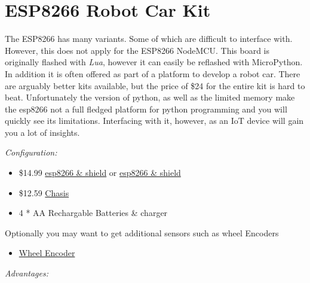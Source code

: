 \section{ESP8266 Robot Car Kit}\label{esp8266-robot-car-kit}

The ESP8266 has many variants. Some of which are difficult to interface
with. However, this does not apply for the ESP8266 NodeMCU. This board
is originally flashed with \emph{Lua}, however it can easily be
reflashed with MicroPython. In addition it is often offered as part of a
platform to develop a robot car. There are arguably better kits
available, but the price of \$24 for the entire kit is hard to beat.
Unfortunately the version of python, as well as the limited memory make
the esp8266 not a full fledged platform for python programming and you
will quickly see its limitations. Interfacing with it, however, as an
IoT device will gain you a lot of insights.

\emph{Configuration:}

\begin{itemize}

\item
  \$14.99
  \href{https://www.amazon.com/KOOKYE-ESP8266-NodeMcu-ESP-12E-Expansion/dp/B01C6MR62E/ref=sr_1_1?ie=UTF8\&qid=1499251895\&sr=8-1\&keywords=esp8266+robot+car}{esp8266
  \& shield} or
  \href{https://www.amazon.com/Makerfocus-ESP8266-ESP-12E-Development-Expansion/dp/B01MU4XQUN/ref=sr_1_2?ie=UTF8\&qid=1499252002\&sr=8-2\&keywords=esp8266+motor+shield}{esp8266
  \& shield}
\item
  \$12.59
  \href{https://www.amazon.com/Emgreat-Chassis-Encoder-wheels-Battery/dp/B00GLO5SMY/ref=pd_rhf_se_s_cp_10?_encoding=UTF8\&pd_rd_i=B00GLO5SMY\&pd_rd_r=77XYGK6BE54FGDTGQ0AC\&pd_rd_w=FNQFl\&pd_rd_wg=wKMdb\&psc=1\&refRID=77XYGK6BE54FGDTGQ0AC}{Chasis}
\item
  4 * AA Rechargable Batteries \& charger
\end{itemize}

Optionally you may want to get additional sensors such as wheel Encoders

\begin{itemize}

\item
  \href{https://www.amazon.com/Wheel-Encoder-Kit-Robot-Car/dp/B00NPWGEIM/ref=sr_1_4?s=toys-and-games\&ie=UTF8\&qid=1499254488\&sr=1-4\&keywords=speed+sensor+robot+car+wheel}{Wheel
  Encoder}
\end{itemize}

\emph{Advantages:}


